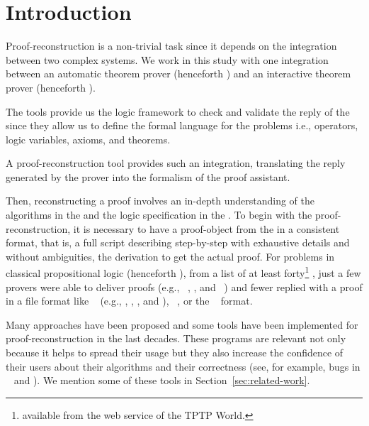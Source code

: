 \documentclass[../main.tex]{subfiles}
\begin{document}

\section{Introduction}
\label{sec:introduction}

Proof-reconstruction is a non-trivial task since it depends on the
integration between two complex systems.
We work in this study with one integration between an automatic theorem
prover (henceforth \ATP) and an interactive theorem prover (henceforth
\ITP).

The \ITP tools provide us the
logic framework to check and validate the reply of the \ATPs since
they allow us to define the formal language for the problems i.e.,
operators, logic variables, axioms, and theorems.

A proof-reconstruction tool provides such an integration, translating
the reply generated by the prover into the formalism of the proof
assistant.


Then, reconstructing a proof involves an in-depth
understanding of the algorithms in the \ATP and the logic specification
in the \ITP. To begin with the proof-reconstruction, it is
necessary to have a proof-object from the \ATP in a consistent
format, that is, a full script describing step-by-step
with exhaustive details and without ambiguities, the derivation to
get the actual proof.
For problems in classical propositional logic (henceforth \CPL),
from a list of at least forty\footnote{\ATPs available from the web
service  of the TPTP World.} \ATPs, just a few
provers were able to deliver proofs (e.g.,
~\cite{Barrett2011}, , and
~\cite{hillenbrand1997}) and fewer replied with
a proof
in a file format like \TSTP~\cite{Sutcliffe-Schulz-Claessen-VanGelder-2006}
(e.g., , \Metis, , and ),
~\cite{Stump2008}, or the ~\cite{Bohme2011} format.

Many approaches have been proposed and some tools have been
implemented for proof-reconstruction in the last decades. These
programs are relevant not only because it helps to spread their
usage but they also increase the confidence of their users about
their algorithms and their correctness (see, for example, bugs in
\ATPs~\cite{Keller2013,Bohme2011,Fleury2014} and
\cite{Kanso2012}).
We mention some of these tools in Section~\ref{sec:related-work}.
\end{document}
